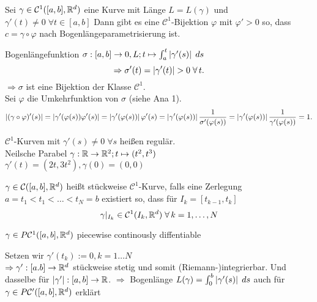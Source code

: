 \documentclass[../ana2.tex]{subfiles}
\begin{document}
\begin{satz}
    Sei \( \gamma \in \mathcal{C}^1([a,b],\R^d) \) eine Kurve 
    mit Länge \(L = L(\gamma)\) und \(\gamma'(t) \neq 0 \; \forall t \in [a,b] \)
    Dann gibt es eine \(\mathcal{C}^1\)-Bijektion \(\varphi\) 
    mit \( \varphi' > 0 \) so, dass \(c = \gamma \circ \varphi\) nach 
    Bogenlängeparametrisierung ist.
\end{satz}
\begin{bew}
    Bogenlängefunktion
    \(\abb{\sigma}{[a,b]}{0, L}; t \mapsto \integralx{\abs{\gamma'(s)}}{a}{t}{s}\)
    \[ \Rightarrow \sigma'(t) = \abs{\gamma'(t)} > 0 \;\forall t. \]
    \( \Rightarrow \sigma \) ist eine Bijektion der Klasse 
    \(\mathcal{C}^1\).\\
    Sei \(\varphi\) die Umkehrfunktion von \(\sigma\) (siehe Ana 1).
    \[\abs{(\gamma \circ \varphi)'(s)} = \abs{\gamma'(\varphi(s))\varphi'(s)} 
    = \abs{\gamma'(\varphi(s))} \varphi'(s) 
    = \abs{\gamma'(\varphi(s))} \frac{1}{\sigma'(\varphi(s))} 
    =  \abs{\gamma'(\varphi(s))} \frac{1}{\gamma'(\varphi(s))} = 1. \]
\end{bew}
\begin{bem}
    \(\mathcal{C}^1\)-Kurven mit \(\gamma'(s) \neq 0 \; \forall s\)
    heißen regulär.\\
    Neilsche Parabel 
    \( \abb{\gamma}{\R}{\R^2}; t \mapsto (t^2, t^3)\)\\
    \(\gamma'(t) = (2t, 3t^2), \gamma(0) = (0, 0)\)
\end{bem}
\begin{defi}
    \(\gamma \in \mathcal{C}([a,b], \R^d)\) heißt stückweise
    \(\mathcal{C}^1\)-Kurve, falls eine Zerlegung
    \(a = t_1 < t_1 < \ldots < t_N = b\) existiert so, dass
    für \( I_k = [t_{k-1}, t_k]\)
    \[ \gamma \vert_{I_k} \in \mathcal{C}^1(I_k, \R^d) \; \forall k = 1,\ldots,N \]
\end{defi}
\begin{notation}
    \( \gamma \in P \mathcal{C}^1([a,b], \R^d)\)
    piecewise continously diffentiable
\end{notation}
Setzen wir \(\gamma'(t_k):= 0, k = 1 \ldots N\) \\
\( \Rightarrow \abb{\gamma'}{[a.b]}{\R^d} \) stückweise stetig 
und somit (Riemann-)integrierbar.
Und dasselbe für \( \abb{\abs{\gamma'} }{[a,b]}{\R} \).
\(\Rightarrow \) Bogenlänge \(L(\gamma) = \integralx{\abs{\gamma'(s)}}{0}{b}{s}\)
auch für \(\gamma \in P \mathcal{C}'([a,b], \R^d)\) erklärt
\end{document}
